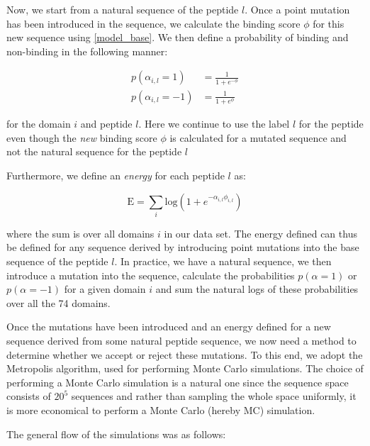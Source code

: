 \documentclass[a4paper, 12pt]{article}
\begin{document}
	Now, we start from a natural sequence of the peptide $l$. Once a point mutation has been introduced in the sequence, we calculate the binding score $\phi$ for this new sequence using \eqref{model_base}. We then define a probability of binding and non-binding in the following manner:

	\begin{align}
	\label{model_1_naive}
	p(\alpha_{i,l}=1) & = \frac{1}{1+e^{-\phi}} \\
	p(\alpha_{i,l}=-1) & = \frac{1}{1+e^{\phi}}
	\end{align}

	for the domain $i$ and peptide $l$. Here we continue to use the label $l$ for the peptide even though the \emph{new} binding score $\phi$ is calculated for a mutated sequence and not the natural sequence for the peptide $l$

	Furthermore, we define an \emph{energy} for each peptide $l$ as:

	\begin{equation}
	\label{model_1_energy}
	\mathrm{E} = \sum_{i} \mathrm{log}(1+e^{-\alpha_{i,l}\phi_{i,l}})
	\end{equation}

	where the sum is over all domains $i$ in our data set. The energy defined can thus be defined for any sequence derived by introducing point mutations into the base sequence of the peptide $l$. In practice, we have a natural sequence, we then introduce a mutation into the sequence, calculate the probabilities $p(\alpha=1)$ or $p(\alpha=-1)$ for a given domain $i$ and sum the natural logs of these probabilities over all the 74 domains. 

	Once the mutations have been introduced and an energy defined for a new sequence derived from some natural peptide sequence, we now need a method to determine whether we accept or reject these mutations. To this end, we adopt the Metropolis algorithm, used for performing Monte Carlo simulations. The choice of performing a Monte Carlo simulation is a natural one since the sequence space consists of $20^5$ sequences and rather than sampling the whole space uniformly, it is more economical to perform a Monte Carlo (hereby MC) simulation.

	The general flow of the simulations was as follows:
\end{document}
